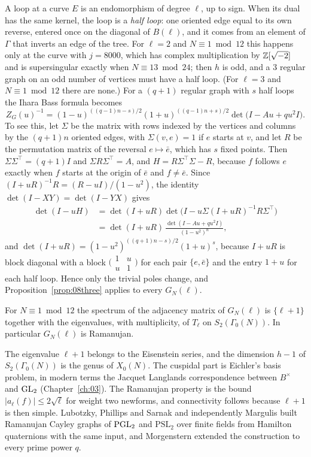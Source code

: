 A loop at a curve $E$ is an endomorphism of degree $\ell$, up to sign. When its dual has the same kernel, the loop is a \emph{half loop}: one oriented edge equal to its own reverse, entered once on the diagonal of $B(\ell)$, and it comes from an element of $\Gamma$ that inverts an edge of the tree. For $\ell=2$ and $N\equiv1\bmod12$ this happens only at the curve with $j=8000$, which has complex multiplication by $\mathbb{Z}[\sqrt{-2}]$ and is supersingular exactly when $N\equiv13\bmod24$; then $h$ is odd, and a $3$ regular graph on an odd number of vertices must have a half loop. (For $\ell=3$ and $N\equiv1\bmod12$ there are none.) For a $(q+1)$ regular graph with $s$ half loops the Ihara Bass formula becomes
\[
Z_G(u)^{-1}=(1-u)^{((q-1)n-s)/2}(1+u)^{((q-1)n+s)/2}\det\bigl(I-Au+qu^2I\bigr).
\]
To see this, let $\Sigma$ be the matrix with rows indexed by the vertices and columns by the $(q+1)n$ oriented edges, with $\Sigma(v,e)=1$ if $e$ starts at $v$, and let $R$ be the permutation matrix of the reversal $e\mapsto\bar e$, which has $s$ fixed points. Then $\Sigma\Sigma^{\top}=(q+1)I$ and $\Sigma R\Sigma^{\top}=A$, and $H=R\Sigma^{\top}\Sigma-R$, because $f$ follows $e$ exactly when $f$ starts at the origin of $\bar e$ and $f\ne\bar e$. Since $(I+uR)^{-1}R=(R-uI)/(1-u^2)$, the identity $\det(I-XY)=\det(I-YX)$ gives
\[
\begin{aligned}
\det(I-uH)&=\det(I+uR)\det\bigl(I-u\Sigma(I+uR)^{-1}R\Sigma^{\top}\bigr)\\
&=\det(I+uR)\,\frac{\det(I-Au+qu^2I)}{(1-u^2)^n},
\end{aligned}
\]
and $\det(I+uR)=(1-u^2)^{((q+1)n-s)/2}(1+u)^s$, because $I+uR$ is block diagonal with a block $\bigl(\begin{smallmatrix}1&u\\u&1\end{smallmatrix}\bigr)$ for each pair $\{e,\bar e\}$ and the entry $1+u$ for each half loop. Hence only the trivial poles change, and Proposition~\ref{prop:08three} applies to every $G_N(\ell)$.

\begin{theorem}\label{thm:08brandt}
For $N\equiv1\bmod12$ the spectrum of the adjacency matrix of $G_N(\ell)$ is $\{\ell+1\}$ together with the eigenvalues, with multiplicity, of $T_\ell$ on $S_2(\Gamma_0(N))$. In particular $G_N(\ell)$ is Ramanujan.
\end{theorem}

The eigenvalue $\ell+1$ belongs to the Eisenstein series, and the dimension $h-1$ of $S_2(\Gamma_0(N))$ is the genus of $X_0(N)$. The cuspidal part is Eichler's basis problem, in modern terms the Jacquet Langlands correspondence between $B^\times$ and $\mathrm{GL}_2$ (Chapter~\ref{ch:03}). The Ramanujan property is the bound $|a_\ell(f)|\le2\sqrt\ell$ for weight two newforms, and connectivity follows because $\ell+1$ is then simple. Lubotzky, Phillips and Sarnak \cite{lps1988} and independently Margulis \cite{margulis1988} built Ramanujan Cayley graphs of $\mathrm{PGL}_2$ and $\mathrm{PSL}_2$ over finite fields from Hamilton quaternions with the same input, and Morgenstern \cite{morgenstern1994} extended the construction to every prime power $q$.

